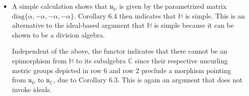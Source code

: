 \documentclass{amsart}
\numberwithin{equation}{section}
\theoremstyle{definition}
\numberwithin{theorem}{section}
\begin{document}
\begin{itemize}
 $ \left\{\left[\begin{array}{ccc}
0  & 0 & w   \\
 0 & 0 & 0 \\
 0 & 0 & 0    
\end{array}\right]:w\in\mathbb{R} \right\} $. Accordingly, there must exist a morphism between $\mathfrak{u}_{A_{11}}$ and $\mathfrak{u}_{\mathbb{D}}$  - and it clearly does by inspection of the depicted uncurling metric algebras at the end of rows 11 and 5.  
 \item A simple calculation shows that $\mathfrak{u}_{\mathbb{H}}$ is given by the parametrized matrix $\text{diag}\{\alpha,-\alpha,-\alpha,-\alpha\}$.  Corollary 6.4 then indicates that  $\mathbb{H}$ is simple.  This is an alternative to the ideal-based argument that $\mathbb{H}$ is simple because it can be shown to be a division algebra.

Independent of the above, the functor indicates that there cannot be an epimorphism from  $\mathbb{H}$ to its subalgebra $\mathbb{C}$ since 	their respective uncurling metric groups depicted in row 6 and row 2 preclude a morphism pointing from $\mathfrak{u}_{\mathbb{H}}$ to $\mathfrak{u}_{\mathbb{C}}$, due to Corollary 6.3.  This is again an argument that does not invoke ideals.
\end{itemize}
\end{document}
